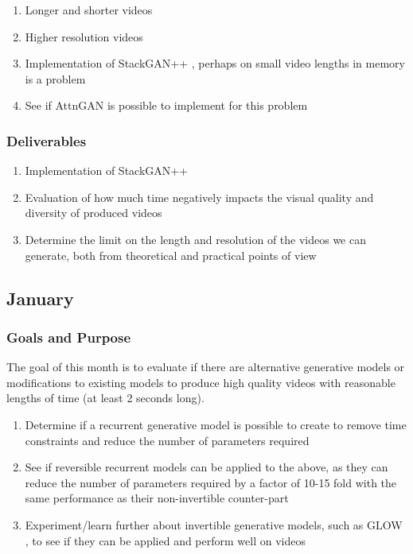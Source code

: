 \documentclass{article}
\begin{document}
{{\begin{enumerate}
    \item Longer and shorter videos
    \item Higher resolution videos
    \item Implementation of StackGAN++ \cite{zhang_stackgan++:_2017}, perhaps on small video lengths in memory is a problem
    \item See if AttnGAN \cite{xu_attngan:_2017} is possible to implement for this problem
\end{enumerate}

\subsubsection{Deliverables}

\begin{enumerate}
    \item Implementation of StackGAN++ \cite{zhang_stackgan++:_2017}
    \item Evaluation of how much time negatively impacts the visual quality and diversity of produced videos
    \item Determine the limit on the length and resolution of the videos we can generate, both from theoretical and practical points of view
\end{enumerate}

\subsection{January}

\subsubsection{Goals and Purpose}

The goal of this month is to evaluate if there are alternative generative models or modifications to existing models to produce high quality videos with reasonable lengths of time (at least 2 seconds long).

\begin{enumerate}
    \item Determine if a recurrent generative model is possible to create to remove time constraints and
          reduce the number of parameters required
    \item See if reversible recurrent models can be applied to the above, as they can reduce
        the number of parameters required by a factor of 10-15 fold with the same performance as their non-invertible counter-part \cite{mackay_reversible_2018}
    \item Experiment/learn further about invertible generative models, such as GLOW \cite{kingma_glow:_2018}, to see if they can be applied and perform well on videos
\end{enumerate}

}}
\end{document}
